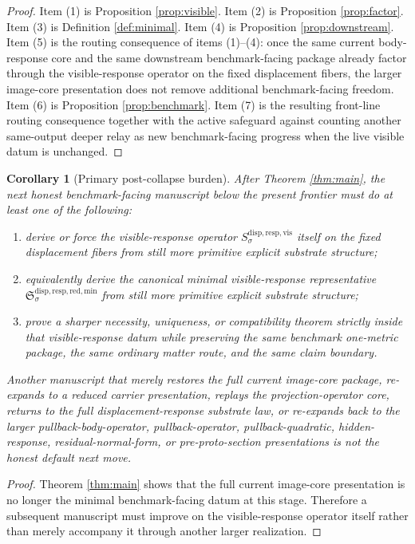\documentclass[11pt]{article}
\newcommand{\VisibleResponseOperator}[1]{S_{#1}^{\mathrm{disp,resp,vis}}}
\newcommand{\MinimalReducedStructure}{\mathfrak S^{\mathrm{disp,resp,red,min}}}
\newtheorem{corollary}{Corollary}
\begin{document}
\begin{proof}
Item (1) is Proposition \ref{prop:visible}. Item (2) is Proposition \ref{prop:factor}. Item (3) is Definition \ref{def:minimal}. Item (4) is Proposition \ref{prop:downstream}. Item (5) is the routing consequence of items (1)--(4): once the same current body-response core and the same downstream benchmark-facing package already factor through the visible-response operator on the fixed displacement fibers, the larger image-core presentation does not remove additional benchmark-facing freedom. Item (6) is Proposition \ref{prop:benchmark}. Item (7) is the resulting front-line routing consequence together with the active safeguard against counting another same-output deeper relay as new benchmark-facing progress when the live visible datum is unchanged.
\end{proof}

\begin{corollary}[Primary post-collapse burden]
\label{cor:next}
After Theorem \ref{thm:main}, the next honest benchmark-facing manuscript below the present frontier must do at least one of the following:
\begin{enumerate}
    \item derive or force the visible-response operator \(\VisibleResponseOperator{\sigma}\) itself on the fixed displacement fibers from still more primitive explicit substrate structure;
    \item equivalently derive the canonical minimal visible-response representative \(\MinimalReducedStructure_{\sigma}\) from still more primitive explicit substrate structure;
    \item prove a sharper necessity, uniqueness, or compatibility theorem strictly inside that visible-response datum while preserving the same benchmark one-metric package, the same ordinary matter route, and the same claim boundary.
\end{enumerate}
Another manuscript that merely restores the full current image-core package, re-expands to a reduced carrier presentation, replays the projection-operator core, returns to the full displacement-response substrate law, or re-expands back to the larger pullback-body-operator, pullback-operator, pullback-quadratic, hidden-response, residual-normal-form, or pre-proto-section presentations is not the honest default next move.
\end{corollary}

\begin{proof}
Theorem \ref{thm:main} shows that the full current image-core presentation is no longer the minimal benchmark-facing datum at this stage. Therefore a subsequent manuscript must improve on the visible-response operator itself rather than merely accompany it through another larger realization.
\end{proof}
\end{document}
